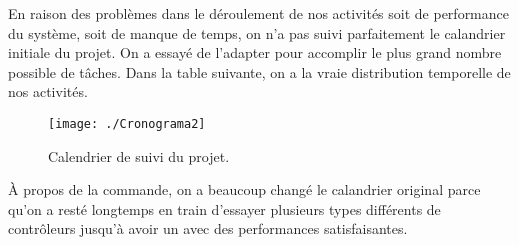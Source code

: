 \label{Suivi}

En raison des problèmes dans le déroulement de nos activités soit de performance du système, soit de manque de temps, on n'a pas suivi parfaitement le calandrier initiale du projet. On a essayé de l'adapter pour accomplir le plus grand nombre possible de tâches. Dans la table suivante, on a la vraie distribution temporelle de nos activités.

\begin{figure}[H]
	\begin{center}	
		\texttt{[image: ./Cronograma2]}
		\caption{Calendrier de suivi du projet.}
		\label{fig:cronograma2}
	\end{center}
\end{figure}

À propos de la commande, on a beaucoup changé le calandrier original parce qu'on a resté longtemps en train d'essayer plusieurs types différents de contrôleurs jusqu'à avoir un avec des performances satisfaisantes.